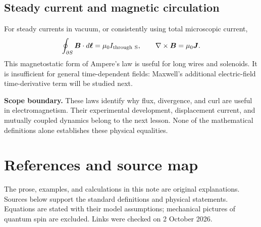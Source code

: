 \documentclass[11pt,letterpaper]{article}
\newcommand{\vect}[1]{\boldsymbol{#1}}
\begin{document}
\subsection*{Steady current and magnetic circulation}
For steady currents in vacuum, or consistently using total microscopic current,
\begin{equation}
\oint_{\partial S}\vect B\cdot d\vect\ell=\mu_0 I_{\rm through\ S},
\qquad \nabla\times\vect B=\mu_0\vect J.
\end{equation}
This magnetostatic form of Ampere's law is useful for long wires and solenoids. It is insufficient for general time-dependent fields: Maxwell's additional electric-field time-derivative term will be studied next.\cite{ampere,maxwell}

\textbf{Scope boundary.} These laws identify why flux, divergence, and curl are useful in electromagnetism. Their experimental development, displacement current, and mutually coupled dynamics belong to the next lesson. None of the mathematical definitions alone establishes these physical equalities.

\newpage
\section*{References and source map}
The prose, examples, and calculations in this note are original explanations. Sources below support the standard definitions and physical statements. Equations are stated with their model assumptions; mechanical pictures of quantum spin are excluded. Links were checked on 2 October 2026.
\end{document}
